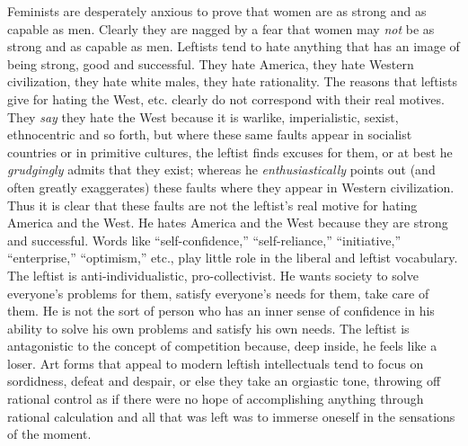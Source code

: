  Feminists are desperately anxious to prove that women are as strong and as capable as men. Clearly they are nagged by a fear that women may {\em not} be as strong and as capable as men.
 Leftists tend to hate anything that has an image of being strong, good and successful. They hate America, they hate Western civilization, they hate white males, they hate rationality. The reasons that leftists give for hating the West, etc. clearly do not correspond with their real motives. They {\em say} they hate the West because it is warlike, imperialistic, sexist, ethnocentric and so forth, but where these same faults appear in socialist countries or in primitive cultures, the leftist finds excuses for them, or at best he {\em grudgingly} admits that they exist; whereas he {\em enthusiastically} points out (and often greatly exaggerates) these faults where they appear in Western civilization. Thus it is clear that these faults are not the leftist’s real motive for hating America and the West. He hates America and the West because they are strong and successful.
 Words like “self-confidence,” “self-reliance,” “initiative,” “enterprise,” “optimism,” etc., play little role in the liberal and leftist vocabulary. The leftist is anti-individualistic, pro-collectivist. He wants society to solve everyone’s problems for them, satisfy everyone’s needs for them, take care of them. He is not the sort of person who has an inner sense of confidence in his ability to solve his own problems and satisfy his own needs. The leftist is antagonistic to the concept of competition because, deep inside, he feels like a loser.\break
{} Art forms that appeal to modern leftish intellectuals tend to focus on sordidness, defeat and despair, or else they take an orgiastic tone, throwing off rational control as if there were no hope of accomplishing anything through rational calculation and all that was left was to immerse oneself in the sensations of the moment.
